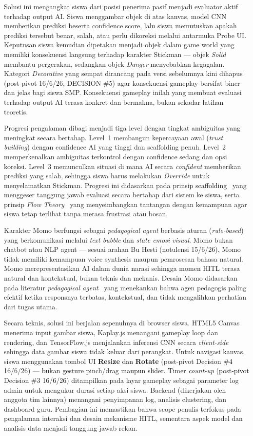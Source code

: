 \documentclass[12pt,a4paper,oneside,openany]{report}
\begin{document}
Solusi ini mengangkat siswa dari posisi penerima pasif menjadi evaluator aktif terhadap output AI. Siswa menggambar objek di atas kanvas, model CNN memberikan prediksi beserta confidence score, lalu siswa memutuskan apakah prediksi tersebut benar, salah, atau perlu dikoreksi melalui antarmuka Probe UI. Keputusan siswa kemudian dipetakan menjadi objek dalam game world yang memiliki konsekuensi langsung terhadap karakter Stickman --- objek \textit{Solid} membantu pergerakan, sedangkan objek \textit{Danger} menyebabkan kegagalan. Kategori \textit{Decorative} yang sempat dirancang pada versi sebelumnya kini dihapus (post-pivot 16/6/26, DECISION \#5) agar konsekuensi gameplay bersifat biner dan jelas bagi siswa SMP. Konsekuensi gameplay inilah yang membuat evaluasi terhadap output AI terasa konkret dan bermakna, bukan sekadar latihan teoretis.

Progresi pengalaman dibagi menjadi tiga level dengan tingkat ambiguitas yang meningkat secara bertahap. Level~1 membangun kepercayaan awal (\textit{trust building}) dengan confidence AI yang tinggi dan scaffolding penuh. Level~2 memperkenalkan ambiguitas terkontrol dengan confidence sedang dan opsi koreksi. Level~3 memunculkan situasi di mana AI secara \textit{confident} memberikan prediksi yang salah, sehingga siswa harus melakukan \textit{Override} untuk menyelamatkan Stickman. Progresi ini didasarkan pada prinsip scaffolding~\cite{ref6}\cite{ref7} yang menggeser tanggung jawab evaluasi secara bertahap dari sistem ke siswa, serta prinsip \textit{Flow Theory}~\cite{ref7} yang menyeimbangkan tantangan dengan kemampuan agar siswa tetap terlibat tanpa merasa frustrasi atau bosan.

Karakter Momo berfungsi sebagai \textit{pedagogical agent} berbasis aturan (\textit{rule-based}) yang berkomunikasi melalui \textit{text bubble} dan \textit{state emosi visual}. Momo bukan chatbot atau NLP agent --- sesuai arahan Bu Hesti (notulensi 15/6/26), Momo tidak memiliki kemampuan voice synthesis maupun pemrosesan bahasa natural. Momo merepresentasikan AI dalam dunia narasi sehingga momen HITL terasa natural dan kontekstual, bukan teknis dan mekanis. Desain Momo didasarkan pada literatur \textit{pedagogical agent}~\cite{ref8} yang menekankan bahwa agen pedagogis paling efektif ketika responsnya terbatas, kontekstual, dan tidak mengalihkan perhatian dari tugas utama.

Secara teknis, solusi ini berjalan sepenuhnya di browser siswa. HTML5 Canvas menerima input gambar siswa, Kaplay.js menangani gameplay loop dan rendering, dan TensorFlow.js menjalankan inferensi CNN secara \textit{client-side} sehingga data gambar siswa tidak keluar dari perangkat. Untuk navigasi kanvas, siswa menggunakan tombol UI \textbf{Resize} dan \textbf{Rotate} (post-pivot Decision \#4 16/6/26) --- bukan gesture pinch/drag maupun slider. Timer \textit{count-up} (post-pivot Decision \#3 16/6/26) ditampilkan pada layar gameplay sebagai parameter log admin untuk mengukur durasi setiap aksi siswa. Backend (dikerjakan oleh anggota tim lainnya) menangani penyimpanan log, analisis clustering, dan dashboard guru. Pembagian ini memastikan bahwa scope penulis terfokus pada pengalaman interaksi dan desain mekanisme HITL, sementara aspek model dan analisis data menjadi tanggung jawab rekan.
\end{document}
